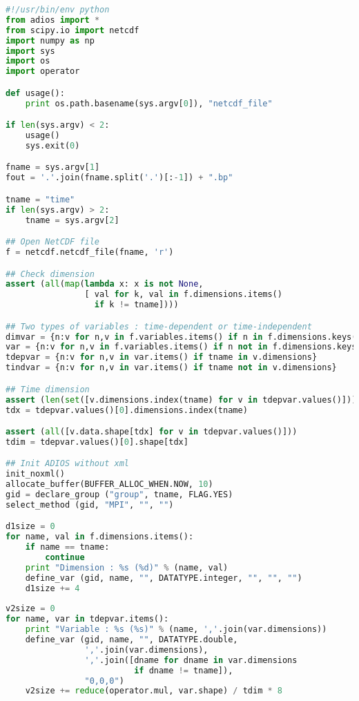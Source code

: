 \begin{lstlisting}[language=python,frame=single, backgroundcolor=\color{gray85},caption={ncdf2bp.py. An example Python/Numpy wrapper code for converting a NetCDF file to a ADIOS BP file},label={},]
#!/usr/bin/env python
from adios import *
from scipy.io import netcdf
import numpy as np
import sys
import os
import operator

def usage():
    print os.path.basename(sys.argv[0]), "netcdf_file"

if len(sys.argv) < 2:
    usage()
    sys.exit(0)

fname = sys.argv[1]
fout = '.'.join(fname.split('.')[:-1]) + ".bp"

tname = "time"
if len(sys.argv) > 2:
    tname = sys.argv[2]

## Open NetCDF file
f = netcdf.netcdf_file(fname, 'r')

## Check dimension
assert (all(map(lambda x: x is not None,
                [ val for k, val in f.dimensions.items()
                  if k != tname])))

## Two types of variables : time-dependent or time-independent
dimvar = {n:v for n,v in f.variables.items() if n in f.dimensions.keys()}
var = {n:v for n,v in f.variables.items() if n not in f.dimensions.keys()}
tdepvar = {n:v for n,v in var.items() if tname in v.dimensions}
tindvar = {n:v for n,v in var.items() if tname not in v.dimensions}

## Time dimension
assert (len(set([v.dimensions.index(tname) for v in tdepvar.values()]))==1)
tdx = tdepvar.values()[0].dimensions.index(tname)

assert (all([v.data.shape[tdx] for v in tdepvar.values()]))
tdim = tdepvar.values()[0].shape[tdx]

## Init ADIOS without xml
init_noxml()
allocate_buffer(BUFFER_ALLOC_WHEN.NOW, 10)
gid = declare_group ("group", tname, FLAG.YES)
select_method (gid, "MPI", "", "")

d1size = 0
for name, val in f.dimensions.items():
    if name == tname:
        continue
    print "Dimension : %s (%d)" % (name, val)
    define_var (gid, name, "", DATATYPE.integer, "", "", "")
    d1size += 4
    
v2size = 0
for name, var in tdepvar.items():
    print "Variable : %s (%s)" % (name, ','.join(var.dimensions))
    define_var (gid, name, "", DATATYPE.double,
                ','.join(var.dimensions),
                ','.join([dname for dname in var.dimensions
                          if dname != tname]),
                "0,0,0")
    v2size += reduce(operator.mul, var.shape) / tdim * 8


\end{lstlisting}
